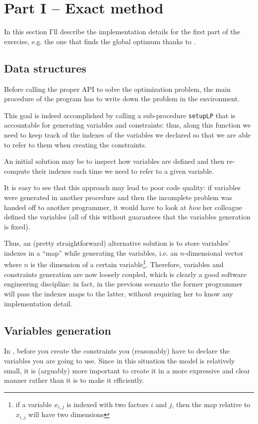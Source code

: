 \section{Part I -- Exact method}

In this section I'll describe the implementation details for the first part of
the exercise, e.g. the one that finds the global optimum thanks to \cplex.

\subsection{Data structures}
Before calling the proper API to solve the optimization problem, the main
procedure of the program has to write down the problem in the \cplex{}
environment.

This goal is indeed accomplished by calling a sub-procedure \texttt{setupLP}
that is accountable for generating variables and constraints: thus, along this
function we need to keep track of the indexes of the variables we declared so
that we are able to refer to them when creating the constraints.

An initial solution may be to inspect how variables are defined and then
re-compute their indexes each time we need to refer to a given variable.

It is easy to see that this approach may lead to poor code quality: if variables
were generated in another procedure and then the incomplete problem was handed
off to another programmer, it would have to look at \textit{how} her colleague
defined the variables (all of this without guarantees that the variables
generation is fixed).

Thus, an (pretty straightforward) alternative solution is to store variables'
indexes in a ``map'' while generating the variables, i.e. an $n$-dimensional
vector where $n$ is the dimension of a certain variable\footnote{if a variable
$x_{i,j}$ is indexed with two factors $i$ and $j$, then the map relative to
$x_{i,j}$ will have two dimensions}.
Therefore, variables and constraints generation are now loosely coupled, which
is clearly a good software engineering discipline: in fact, in the previous
scenario the former programmer will pass the indexes maps to the latter, without
requiring her to know any implementation detail.

\subsection{Variables generation}
In \cplex, before you create the constraints you (reasonably) have to declare
the variables you are going to use. Since in this situation the model is
relatively small, it is (arguably) more important to create it in a more
expressive and clear manner rather than it is to make it efficiently.

